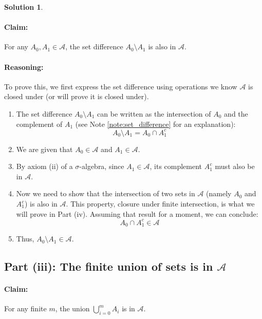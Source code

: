 \documentclass[11pt,a4paper]{article}
\theoremstyle{definition}
\newtheorem*{solution}{Solution}
\begin{document}
\begin{solution}
\paragraph{Claim:} For any $A_0, A_1 \in \mathcal{A}$, the set difference $A_0 \setminus A_1$ is also in $\mathcal{A}$.

\paragraph{Reasoning:}
To prove this, we first express the set difference using operations we know $\mathcal{A}$ is closed under (or will prove it is closed under).
\begin{enumerate}
    \item The set difference $A_0 \setminus A_1$ can be written as the intersection of $A_0$ and the complement of $A_1$ (see Note \ref{note:set_difference} for an explanation):
    \[ A_0 \setminus A_1 = A_0 \cap A_1^c \]
    \item We are given that $A_0 \in \mathcal{A}$ and $A_1 \in \mathcal{A}$.
    \item By axiom (ii) of a $\sigma$-algebra, since $A_1 \in \mathcal{A}$, its complement $A_1^c$ must also be in $\mathcal{A}$.
    \item Now we need to show that the intersection of two sets in $\mathcal{A}$ (namely $A_0$ and $A_1^c$) is also in $\mathcal{A}$. This property, closure under finite intersection, is what we will prove in Part (iv). Assuming that result for a moment, we can conclude:
    \[ A_0 \cap A_1^c \in \mathcal{A} \]
    \item Thus, $A_0 \setminus A_1 \in \mathcal{A}$.
\end{enumerate}

\subsection*{Part (iii): The finite union of sets is in $\mathcal{A}$}

\paragraph{Claim:} For any finite $m$, the union $\bigcup_{i=0}^{m} A_i$ is in $\mathcal{A}$.


\end{solution}
\end{document}
